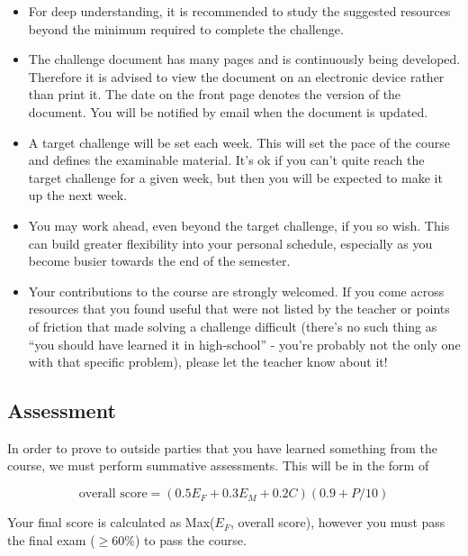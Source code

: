 \begin{itemize}
    \item For deep understanding, it is recommended to study the suggested resources beyond the minimum required to complete the challenge.
    \item The challenge document has many pages and is continuously being developed. Therefore it is advised to view the document on an electronic device rather than print it. The date on the front page denotes the version of the document. You will be notified by email when the document is updated.
    \item A target challenge will be set each week. This will set the pace of the course and defines the examinable material. It's ok if you can't quite reach the target challenge for a given week, but then you will be expected to make it up the next week.
    \item You may work ahead, even beyond the target challenge, if you so wish. This can build greater flexibility into your personal schedule, especially as you become busier towards the end of the semester.
    \item Your contributions to the course are strongly welcomed. If you come across resources that you found useful that were not listed by the teacher or points of friction that made solving a challenge difficult (there's no such thing as ``you should have learned it in high-school'' - you're probably not the only one with that specific problem), please let the teacher know about it!
\end{itemize}

\subsection{Assessment}
In order to prove to outside parties that you have learned something from the course, we must perform summative assessments. This will be in the form of

\begin{equation*}
    \text{overall score} = (0.5 E_F + 0.3 E_M + 0.2 C) (0.9 + P/10)
\end{equation*}

Your final score is calculated as Max($E_F$, overall score), however you must pass the final exam ($\ge 60\%$) to pass the course.

